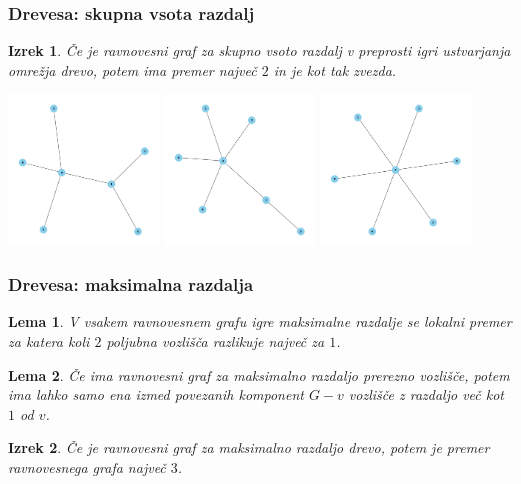 \documentclass[12pt, hyperref={unicode}]{beamer}
\newtheorem{izrek}{Izrek}
\newtheorem{lema}{Lema}
\begin{document}
\begin{frame}

  \frametitle{Drevesa: skupna vsota razdalj}
  \begin{izrek}
    Če je ravnovesni graf za skupno vsoto razdalj v preprosti igri ustvarjanja
    omrežja drevo, potem ima premer največ $2$ in je kot tak zvezda.
  \end{izrek}

  \includegraphics[width=0.3\textwidth]{drevo_1.png}
  \includegraphics[width=0.3\textwidth]{drevo_2.png}
  \includegraphics[width=0.3\textwidth]{drevo_3.png}
\end{frame}

\begin{frame}
   
  \frametitle{Drevesa: maksimalna razdalja}
  \begin{lema}
    V vsakem ravnovesnem grafu igre maksimalne razdalje se lokalni premer za
    katera koli $2$ poljubna vozlišča razlikuje največ za $1$.
  \end{lema}

  \begin{lema}
    Če ima ravnovesni graf za maksimalno razdaljo prerezno vozlišče, potem ima lahko
    samo ena izmed povezanih komponent $G - v$ vozlišče z razdaljo več kot $1$ od $v$.
  \end{lema}

  \begin{izrek}
    Če je ravnovesni graf za maksimalno razdaljo drevo, potem je premer ravnovesnega grafa največ $3$.
  \end{izrek}

\end{frame}
\end{document}
